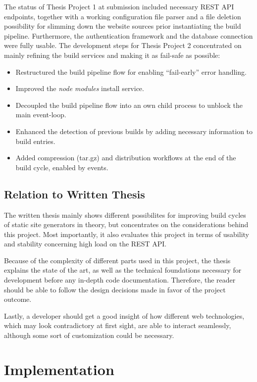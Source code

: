\documentclass[a4paper,english,11pt]{report}
\begin{document}
The status of Thesis Project 1 at submission included necessary REST API endpoints, together with a working configuration file parser and a file deletion possibility for slimming down the website sources prior instantiating the build pipeline. Furthermore, the authentication framework and the database connection were fully usable. The development steps for Thesis Project 2 concentrated on mainly refining the build services and making it as fail-safe as possible:

\begin{itemize}
  \item Restructured the build pipeline flow for enabling ``fail-early'' error handling.
  \item Improved the \emph{node modules} install service.
  \item Decoupled the build pipeline flow into an own child process to unblock the main event-loop.
  \item Enhanced the detection of previous builds by adding necessary information to build entries.
  \item Added compression (tar.gz) and distribution workflows at the end of the build cycle, enabled by events.
\end{itemize}

\section{Relation to Written Thesis}
\label{sec:relation-thesis}
The written thesis mainly shows different possibilites for improving build cycles of static site generators in theory, but concentrates on the considerations behind this project. Most importantly, it also evaluates this project in terms of usability and stability concerning high load on the REST API.

Because of the complexity of different parts used in this project, the thesis explains the state of the art, as well as the technical foundations necessary for development before any in-depth code documentation. Therefore, the reader should be able to follow the design decisions made in favor of the project outcome.

Lastly, a developer should get a good insight of how different web technologies, which may look contradictory at first sight, are able to interact seamlessly, although some sort of customization could be necessary.
%

\chapter{Implementation}
\end{document}
